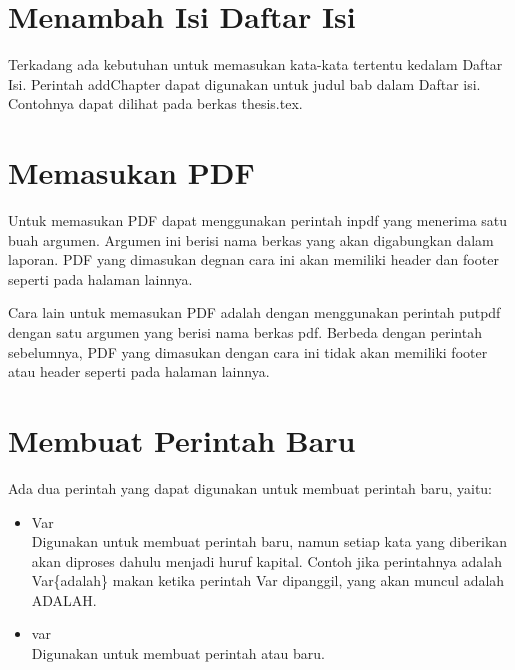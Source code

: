 \section{Menambah Isi Daftar Isi}
Terkadang ada kebutuhan untuk memasukan kata-kata tertentu kedalam Daftar Isi. 
Perintah \bslash addChapter dapat digunakan untuk judul bab dalam Daftar isi. 
Contohnya dapat dilihat pada berkas thesis.tex.


\section{Memasukan PDF}
Untuk memasukan PDF dapat menggunakan perintah \bslash inpdf yang menerima satu 
buah argumen. Argumen ini berisi nama berkas yang akan digabungkan dalam 
laporan. PDF yang dimasukan degnan cara ini akan memiliki header dan footer 
seperti pada halaman lainnya. 


Cara lain untuk memasukan PDF adalah dengan menggunakan perintah \bslash putpdf 
dengan satu argumen yang berisi nama berkas pdf. Berbeda dengan perintah 
sebelumnya, PDF yang dimasukan dengan cara ini tidak akan memiliki footer atau 
header seperti pada halaman lainnya. 



\section{Membuat Perintah Baru}
Ada dua perintah yang dapat digunakan untuk membuat perintah baru, yaitu: 
\begin{itemize}
	\item \bslash Var \\
		Digunakan untuk membuat perintah baru, namun setiap kata yang diberikan
		akan diproses dahulu menjadi huruf kapital. 
		Contoh jika perintahnya adalah \bslash Var\{adalah\} makan ketika 
		perintah \bslash Var dipanggil, yang akan muncul adalah ADALAH. 
	\item \bslash var \\
		Digunakan untuk membuat perintah atau baru. 
\end{itemize}


